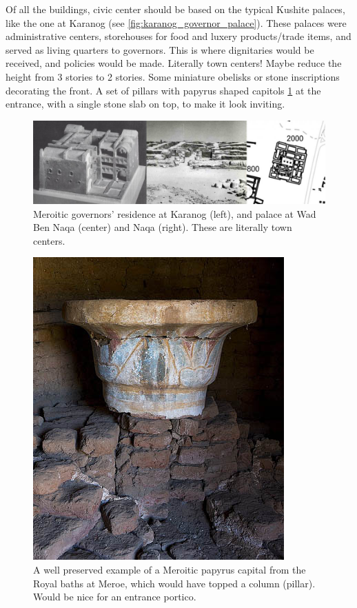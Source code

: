 \documentclass[a4paper,12pt]{scrreprt}
\begin{document}
Of all the buildings, civic center should be based on the typical Kushite palaces, like the one at Karanog (see \ref{fig:karanog_governor_palace}). These palaces were administrative centers, storehouses for food and luxery products/trade items, and served as living quarters to governors. This is where dignitaries would be received, and policies would be made. Literally town centers! Maybe reduce the height from 3 stories to 2 stories. Some miniature obelisks or stone inscriptions decorating the front. A set of pillars with papyrus shaped capitols \ref{fig:papyrus_capitol} at the entrance, with a single stone slab on top, to make it look inviting. 

\begin{figure}[H]
	\centering
	\includegraphics[width=\textwidth]{img/civic_center/three_palace_pictures}
	\caption{Meroitic governors' residence at Karanog (left), and palace at Wad Ben Naqa (center) and Naqa (right). These are literally town centers.}
\end{figure}

\begin{figure}[H]
	\centering
	\includegraphics[width=\textwidth]{img/civic_center/papyrus_shaped_capitols}
	\caption{A well preserved example of a Meroitic papyrus capital from the Royal baths at Meroe, which would have topped a column (pillar). Would be nice for an entrance portico.}\label{fig:papyrus_capitol}
\end{figure}
\end{document}
